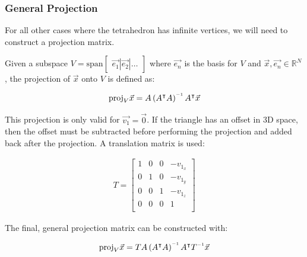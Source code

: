 \subsubsection{General Projection}

For all other cases where the tetrahedron has infinite vertices, we will need to
construct a projection matrix.

Given a subspace $V = \text{span} \begin{bmatrix} \vec{e_1} | \vec{e_2} | \ldots
\end{bmatrix}$ where $\vec{e_n}$ is the basis for $V$  and  $\vec{x} , \vec{e_n}
\in  \mathbb{R}^N$,  the  projection  of  $\vec{x}$  onto  $V$  is  defined  as:

\begin{align}
    \label{eq:projection_origin}
    \text{proj}_V\vec{x} = A\left(A\transpose A\right)\inverse A\transpose\vec{x}
\end{align}

This projection is only valid for $\vec{v_1} = \vec{0}$.  If the triangle has an
offset in 3D space,  then  the  offset  must be subtracted before performing the
projection and added back after the projection. A translation matrix is used:

\begin{align}
    \label{eq:translate_offset}
    T = \begin{bmatrix}
        1 & 0 & 0 & -v_{1_x} \\
        0 & 1 & 0 & -v_{1_y} \\
        0 & 0 & 1 & -v_{1_z} \\
        0 & 0 & 0 & 1 \\
    \end{bmatrix}
\end{align}

The final, general projection matrix can be constructed with:

\begin{align}
    \label{eq:projection}
    \text{proj}_V\vec{x} = TA\left(A\transpose A\right)\inverse A\transpose T\inverse\vec{x}
\end{align}
